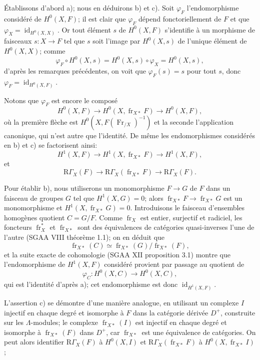 \documentclass[11pt]{article}
\providecommand{\RGamma}{\mathrm R\Gamma}
\providecommand{\id}{\operatorname{id}}
\providecommand{\id}{\operatorname{id}}
\providecommand{\id}{\operatorname{id}}
\providecommand{\RGamma}{\mathrm R\Gamma}
\providecommand{\id}{\operatorname{id}}
\providecommand{\id}{\operatorname{id}}
\providecommand{\fr}{\operatorname{fr}}
\providecommand{\Fr}{\operatorname{Fr}}
\providecommand{\Fr}{\operatorname{Fr}}
\providecommand{\fr}{\operatorname{fr}}
\providecommand{\id}{\operatorname{id}}
\providecommand{\RGamma}{\mathrm R\Gamma}
\begin{document}
Établissons d'abord a); nous en déduirons b) et c). Soit $\varphi_F$ l'endomorphisme considéré de $H^0(X,F)$; il est clair que $\varphi_F$ dépend fonctoriellement de $F$ et que $\varphi_X=\id_{H^0(X,X)}$. Or tout élément $s$ de $H^0(X,F)$ s'identifie à un morphisme de faisceaux $s:X\to F$ tel que $s$ soit l'image par $H^0(X,s)$ de l'unique élément de $H^0(X,X)$; comme
\[
\varphi_F\circ H^0(X,s)=H^0(X,s)\circ\varphi_X=H^0(X,s),
\]
d'après les remarques précédentes, on voit que $\varphi_F(s)=s$ pour tout $s$, donc $\varphi_F=\id_{H^0(X,F)}$.

Notons que $\varphi_F$ est encore le composé
\[
H^0(X,F)\longrightarrow H^0(X,\fr_{X*}F)
\longrightarrow H^0(X,F),
\]
où la première flèche est $H^0(X,F(\Fr_{/X})^{-1})$ et la seconde l'application canonique, qui n'est autre que l'identité. De même les endomorphismes considérés en b) et c) se factorisent ainsi:
\[
H^1(X,F)\longrightarrow H^1(X,\fr_{X*}F)
\longrightarrow H^1(X,F),
\]
et
\[
\RGamma_X(F)\longrightarrow \RGamma_X(\fr_{X*}F)
\longrightarrow \RGamma_X(F).
\]

Pour établir b), nous utiliserons un monomorphisme $F\to G$ de $F$ dans un faisceau de groupes $G$ tel que $H^1(X,G)=0$; alors $\fr_{X*}F\to\fr_{X*}G$ est un monomorphisme et $H^1(X,\fr_{X*}G)=0$. Introduisons le faisceau d'ensembles homogènes quotient $C=G/F$. Comme $\fr_X$ est entier, surjectif et radiciel, les foncteurs $\fr_X^*$ et $\fr_{X*}$ sont des équivalences de catégories quasi-inverses l'une de l'autre (SGAA VIII théorème 1.1); on en déduit que
\[
\fr_{X*}(C)\simeq\fr_{X*}(G)/\fr_{X*}(F),
\]
et la suite exacte de cohomologie (SGAA XII proposition 3.1) montre que l'endomorphisme de $H^1(X,F)$ considéré provient par passage au quotient de
\[
\varphi_C:H^0(X,C)\longrightarrow H^0(X,C),
\]
qui est l'identité d'après a); cet endomorphisme est donc $\id_{H^1(X,F)}$.

L'assertion c) se démontre d'une manière analogue, en utilisant un complexe $I$ injectif en chaque degré et isomorphe à $F$ dans la catégorie dérivée $D^+$, construite sur les $\Lambda$-modules; le complexe $\fr_{X*}(I)$ est injectif en chaque degré et isomorphe à $\fr_{X*}(F)$ dans $D^+$, car $\fr_{X*}$ est une équivalence de catégories. On peut alors identifier $\RGamma_X(F)$ à $H^0(X,I)$ et $\RGamma_X(\fr_{X*}F)$ à $H^0(X,\fr_{X*}I)$;%
\end{document}
